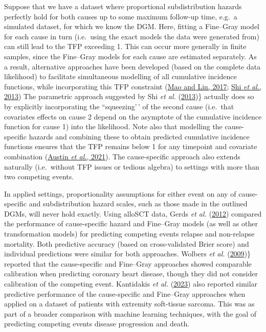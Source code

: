 \documentclass[
  letterpaper,
  DIV=11,
  numbers=noendperiod]{scrreprt}
\begin{document}
Suppose that we have a dataset where proportional subdistribution
hazards perfectly hold for both causes up to some maximum follow-up
time, e.g.~a simulated dataset, for which we know the DGM. Here, fitting
a Fine--Gray model for each cause in turn (i.e.~using the exact models
the data were generated from) can still lead to the TFP exceeding 1.
This can occur more generally in finite samples, since the Fine--Gray
models for each cause are estimated separately. As a result, alternative
approaches have been developed (based on the complete data likelihood)
to facilitate simultaneous modelling of all cumulative incidence
functions, while incorporating this TFP constraint
(\protect\hyperlink{ref-maoEfficientEstimationSemiparametric2017}{Mao
and Lin, 2017};
\protect\hyperlink{ref-shiConstrainedParametricModel2013}{Shi \emph{et
al.}, 2013}) The parametric approach suggested by Shi \emph{et al.}
(\protect\hyperlink{ref-shiConstrainedParametricModel2013}{2013})\}
actually does so by explicitly incorporating the ``squeezing'\,' of the
second cause (i.e.~that covariates effects on cause 2 depend on the
asymptote of the cumulative incidence function for cause 1) into the
likelihood. Note also that modelling the cause-specific hazards and
combining these to obtain predicted cumulative incidence functions
ensures that the TFP remains below 1 for any timepoint and covariate
combination
(\protect\hyperlink{ref-austinFineGraySubdistributionHazard2021}{Austin
\emph{et al.}, 2021}). The cause-specific approach also extends
naturally (i.e.~without TFP issues or tedious algebra) to settings with
more than two competing events.

In applied settings, proportionality assumptions for either event on any
of cause-specific and subdistribution hazard scales, such as those made
in the outlined DGMs, will never hold exactly. Using alloSCT data, Gerds
\emph{et al.}
(\protect\hyperlink{ref-gerdsAbsoluteRiskRegression2012a}{2012})
compared the performance of cause-specific hazard and Fine--Gray models
(as well as other transformation models) for predicting competing events
relapse and non-relapse mortality. Both predictive accuracy (based on
cross-validated Brier score) and individual predictions were similar for
both approaches. Wolbers \emph{et al.}
(\protect\hyperlink{ref-wolbersPrognosticModelsCompeting2009}{2009})\}
reported that the cause-specific and Fine--Gray approaches showed
comparable calibration when predicting coronary heart disease, though
they did not consider calibration of the competing event. Kantidakis
\emph{et al.}
(\protect\hyperlink{ref-kantidakisStatisticalModelsMachine2023}{2023})
also reported similar predictive performance of the cause-specific and
Fine--Gray approaches when applied on a dataset of patients with
extremity soft-tissue sarcoma. This was as part of a broader comparison
with machine learning techniques, with the goal of predicting competing
events disease progression and death.
\end{document}
